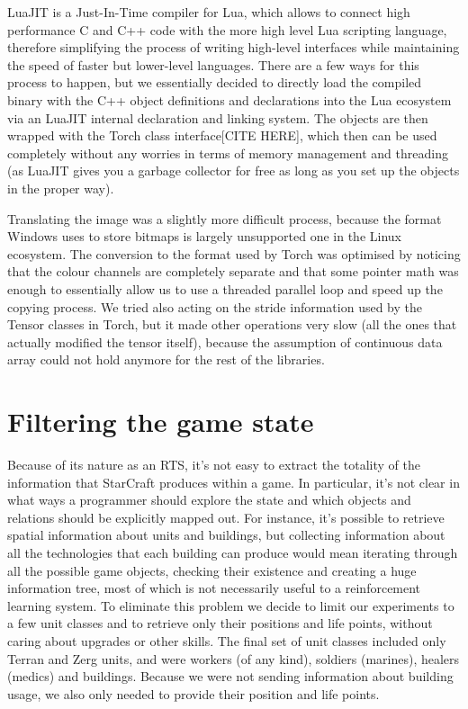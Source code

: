 \documentclass[bsc,frontabs,twoside,singlespacing,parskip,deptreport]{infthesis}     %
\begin{document}
LuaJIT is a Just-In-Time compiler for Lua, which allows to connect high
performance C and C++ code with the more high level Lua scripting language,
therefore simplifying the process of writing high-level interfaces while
maintaining the speed of faster but lower-level languages. There are a few ways
for this process to happen, but we essentially decided to directly load the
compiled binary with the C++ object definitions and declarations into the Lua
ecosystem via an LuaJIT internal declaration and linking system. The objects are
then wrapped with the Torch class interface[CITE HERE], which then can be used
completely without any worries in terms of memory management and threading (as
LuaJIT gives you a garbage collector for free as long as you set up the objects
in the proper way).

Translating the image was a slightly more difficult process, because the format
Windows uses to store bitmaps is largely unsupported one in the Linux ecosystem.
The conversion to the format used by Torch was optimised by noticing that the
colour channels are completely separate and that some pointer math was enough to
essentially allow us to use a threaded parallel loop and speed up the copying
process. We tried also acting on the stride information used by the Tensor
classes in Torch, but it made other operations very slow (all the ones that
actually modified the tensor itself), because the assumption of continuous data
array could not hold anymore for the rest of the libraries.

\section{Filtering the game state}

Because of its nature as an RTS, it's not easy to extract the totality of the
information that StarCraft produces within a game. In particular, it's not clear
in what ways a programmer should explore the state and which objects and
relations should be explicitly mapped out. For instance, it's possible to
retrieve spatial information about units and buildings, but collecting
information about all the technologies that each building can produce would mean
iterating through all the possible game objects, checking their existence and
creating a huge information tree, most of which is not necessarily useful to a
reinforcement learning system. To eliminate this problem we decide to limit our
experiments to a few unit classes and to retrieve only their positions and life
points, without caring about upgrades or other skills. The final set of unit
classes included only Terran and Zerg units, and were workers (of any kind),
soldiers (marines), healers (medics) and buildings. Because we were not sending
information about building usage, we also only needed to provide their position
and life points.
\end{document}
